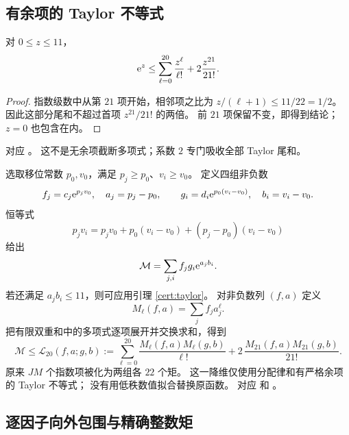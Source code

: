 \subsection{有余项的 Taylor 不等式}

\begin{lemma}\label{cert:taylor}
对 $0\leq z\leq11$，
\begin{equation}\label{cert:taylor-eq}
 \mathrm e^z\leq\sum_{\ell=0}^{20}\frac{z^\ell}{\ell!}
                         +2\frac{z^{21}}{21!}.
\end{equation}
\end{lemma}
\begin{proof}
指数级数中从第 $21$ 项开始，相邻项之比为
$z/(\ell+1)\leq11/22=1/2$。
因此这部分尾和不超过首项 $z^{21}/21!$ 的两倍。
前 $21$ 项保留不变，即得到结论；$z=0$ 也包含在内。
\end{proof}
对应 。
这不是无余项截断多项式；系数 $2$ 专门吸收全部 Taylor 尾和。

选取移位常数 $p_0,v_0$，满足 $p_j\geq p_0$、$v_i\geq v_0$。
定义四组非负数
\begin{equation}\label{cert:shifted-factors}
 f_j=c_j\mathrm e^{p_jv_0},\quad a_j=p_j-p_0,\qquad
 g_i=d_i\mathrm e^{p_0(v_i-v_0)},\quad b_i=v_i-v_0 .
\end{equation}
恒等式
\[
 p_jv_i=p_jv_0+p_0(v_i-v_0)+(p_j-p_0)(v_i-v_0)
\]
给出
\begin{equation}\label{cert:factorization}
 \mathcal M=\sum_{j,i}f_jg_i\mathrm e^{a_jb_i}.
\end{equation}
若还满足 $a_jb_i\leq11$，则可应用引理 \ref{cert:taylor}。
对非负数列 $(f,a)$ 定义
\[
 M_\ell(f,a)=\sum_j f_ja_j^\ell .
\]
把有限双重和中的多项式逐项展开并交换求和，得到
\begin{equation}\label{cert:low-rank}
 \mathcal M\leq
 \mathcal L_{20}(f,a;g,b):=
 \sum_{\ell=0}^{20}
       \frac{M_\ell(f,a)M_\ell(g,b)}{\ell!}
       +2\,\frac{M_{21}(f,a)M_{21}(g,b)}{21!}.
\end{equation}
原来 $J M$ 个指数项被化为两组各 $22$ 个矩。
这一降维仅使用分配律和有严格余项的 Taylor 不等式；
没有用低秩数值拟合替换原函数。
对应 
和 。

\subsection{逐因子向外包围与精确整数矩}

